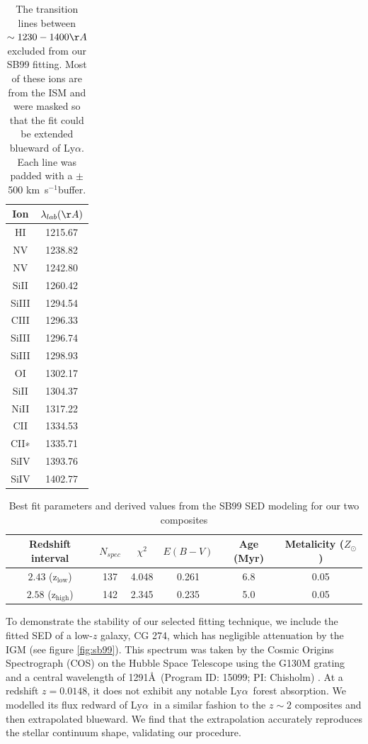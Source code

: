 \documentclass[twocolumn,tight,times]{aastex63}
\newcommand{\lya}{Ly$\alpha$}
\newcommand{\kms}{km~s$^{-1}$}
\newcommand{\hiz}{$\mathrm{z_{high}}$}
\newcommand{\loz}{$\mathrm{z_{low}}$}
\begin{document}
\begin{table}[ht]
    \centering
    \caption{The transition lines between $\sim 1230-1400\AA$ excluded from our SB99 fitting. Most of these ions are from the ISM \citep{Leitherer_2011} and were masked so that the fit could be extended blueward of \lya. Each line was padded with a $\pm$ 500 \kms buffer.}
    \label{tab:ISM}
    \vskip0.1in
    \begin{tabular}{c|c}
    \hline
    \hline
    Ion & $\lambda_{lab} (\AA)$\\
    \hline
    HI & 1215.67\\
    NV & 1238.82\\
    NV & 1242.80\\
    SiII & 1260.42\\
    SiIII & 1294.54\\
    CIII & 1296.33\\
    SiIII & 1296.74\\
    SiIII & 1298.93\\
    OI & 1302.17\\
    SiII & 1304.37\\
    NiII & 1317.22\\
    CII & 1334.53\\
    CII∗ & 1335.71\\
    SiIV & 1393.76\\
    SiIV & 1402.77\\
    \hline
    \end{tabular}
\end{table}


\begin{table}[ht]
\begin{center}
\caption{Best fit parameters and derived values from the SB99 SED modeling for our two composites}
\label{tab:params}
\vskip0.1in
\begin{tabular}{c|c|c|c|c|c}
\hline
\hline
Redshift interval & $N_{spec}$ & $\chi^{2}$ & $E(B-V)$ & Age (Myr) & Metalicity ($Z_\odot$)\\
\hline
$2.43$ (\loz) & 137 & 4.048 & 0.261 & 6.8 & 0.05\\
$2.58$ (\hiz) & 142 & 2.345 & 0.235 & 5.0 & 0.05\\
\hline
\end{tabular}
\end{center}
\end{table}

To demonstrate the stability of our selected fitting technique, we include the fitted SED of a low-$z$ galaxy, CG 274, which has negligible attenuation by the IGM (see figure \ref{fig:sb99}). This spectrum was taken by the Cosmic Origins Spectrograph (COS) on the Hubble Space Telescope using the G130M grating and a central wavelength of 1291\AA\ (Program ID: 15099; PI: Chisholm) . At a redshift $z = 0.0148$, it does not exhibit any notable \lya\ forest absorption. We modelled its flux redward of \lya\ in a similar fashion to the $z \sim 2$ composites and then extrapolated blueward. We find that the extrapolation accurately reproduces the stellar continuum shape, validating our procedure.
\end{document}
